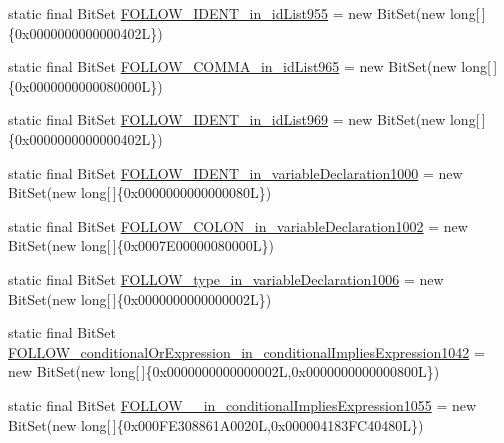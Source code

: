\begin{DoxyCompactItemize}
static final Bit\-Set \hyperlink{classorg_1_1tzi_1_1use_1_1parser_1_1testsuite_1_1_test_suite_parser_a7c03700c6f342af2e7998f95c381513c}{F\-O\-L\-L\-O\-W\-\_\-\-I\-D\-E\-N\-T\-\_\-in\-\_\-id\-List955} = new Bit\-Set(new long\mbox{[}$\,$\mbox{]}\{0x0000000000000402\-L\})
\item 
static final Bit\-Set \hyperlink{classorg_1_1tzi_1_1use_1_1parser_1_1testsuite_1_1_test_suite_parser_ad2beb56ada62beb15f1efa4235cb737e}{F\-O\-L\-L\-O\-W\-\_\-\-C\-O\-M\-M\-A\-\_\-in\-\_\-id\-List965} = new Bit\-Set(new long\mbox{[}$\,$\mbox{]}\{0x0000000000080000\-L\})
\item 
static final Bit\-Set \hyperlink{classorg_1_1tzi_1_1use_1_1parser_1_1testsuite_1_1_test_suite_parser_a43f54e97595e7ecd1de691a8c78a03c7}{F\-O\-L\-L\-O\-W\-\_\-\-I\-D\-E\-N\-T\-\_\-in\-\_\-id\-List969} = new Bit\-Set(new long\mbox{[}$\,$\mbox{]}\{0x0000000000000402\-L\})
\item 
static final Bit\-Set \hyperlink{classorg_1_1tzi_1_1use_1_1parser_1_1testsuite_1_1_test_suite_parser_a3ef75e586bf900ff43f360e8ee813be4}{F\-O\-L\-L\-O\-W\-\_\-\-I\-D\-E\-N\-T\-\_\-in\-\_\-variable\-Declaration1000} = new Bit\-Set(new long\mbox{[}$\,$\mbox{]}\{0x0000000000000080\-L\})
\item 
static final Bit\-Set \hyperlink{classorg_1_1tzi_1_1use_1_1parser_1_1testsuite_1_1_test_suite_parser_a79b2aaf07f07c72083d7a4ec6f17562f}{F\-O\-L\-L\-O\-W\-\_\-\-C\-O\-L\-O\-N\-\_\-in\-\_\-variable\-Declaration1002} = new Bit\-Set(new long\mbox{[}$\,$\mbox{]}\{0x0007\-E00000080000\-L\})
\item 
static final Bit\-Set \hyperlink{classorg_1_1tzi_1_1use_1_1parser_1_1testsuite_1_1_test_suite_parser_a980de0ccb0e5614118c29c029c4e5de6}{F\-O\-L\-L\-O\-W\-\_\-type\-\_\-in\-\_\-variable\-Declaration1006} = new Bit\-Set(new long\mbox{[}$\,$\mbox{]}\{0x0000000000000002\-L\})
\item 
static final Bit\-Set \hyperlink{classorg_1_1tzi_1_1use_1_1parser_1_1testsuite_1_1_test_suite_parser_a0956a0bbe2af7e829d3fd377ebadc47a}{F\-O\-L\-L\-O\-W\-\_\-conditional\-Or\-Expression\-\_\-in\-\_\-conditional\-Implies\-Expression1042} = new Bit\-Set(new long\mbox{[}$\,$\mbox{]}\{0x0000000000000002\-L,0x0000000000000800\-L\})
\item 
static final Bit\-Set \hyperlink{classorg_1_1tzi_1_1use_1_1parser_1_1testsuite_1_1_test_suite_parser_a13a8d845380afb043f6467f5783846dc}{F\-O\-L\-L\-O\-W\-\_\-\_\-in\-\_\-conditional\-Implies\-Expression1055} = new Bit\-Set(new long\mbox{[}$\,$\mbox{]}\{0x000\-F\-E308861\-A0020\-L,0x000004183\-F\-C40480\-L\})

\end{DoxyCompactItemize}
